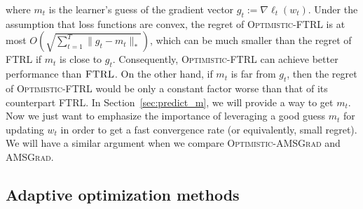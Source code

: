 \documentclass[11pt]{article}
\theoremstyle{k}
\begin{document}
where 
$m_{t}$ is the learner's guess of the gradient vector $g_{t}:=\nabla \ell_t(w_t)$.
Under the assumption that loss functions are convex,
the regret of \textsc{Optimistic-FTRL} is at most
$O(\sqrt{\sum_{t=1}^T \| g_t - m_t \|_*  } )$,
which can be much smaller than the regret of \textsc{FTRL} if $m_{t}$ is close to $g_{t}$.
Consequently, \textsc{Optimistic-FTRL} can achieve better performance than $\textsc{FTRL}$.
On the other hand, if $m_t$ is far from $g_t$, then 
the regret of \textsc{Optimistic-FTRL} would be only a constant factor worse than that of its counterpart \textsc{FTRL}. 
In Section~\ref{sec:predict_m}, we will provide a way to get $m_t$. Now we just want to emphasize the importance of leveraging a good guess $m_t$ for updating $w_t$ in order to get a fast convergence rate (or equivalently, small regret). We will have a similar argument when we compare \textsc{Optimistic-AMSGrad} and \textsc{AMSGrad}.

\subsection{Adaptive optimization methods}
\end{document}
